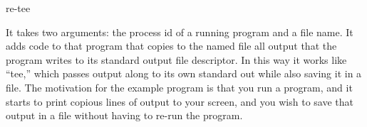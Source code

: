 re-tee

It takes two arguments: the process id of a running program and a
file name. It adds code to that program that
copies to the named file all output that the program writes to its
standard output file descriptor. In this way it
works like ``tee,'' which passes output along to its own standard out
while also saving it in a file. The motivation
for the example program is that you run a program, and it starts to
print copious lines of output to your screen, and
you wish to save that output in a file without having to re-run the program.


